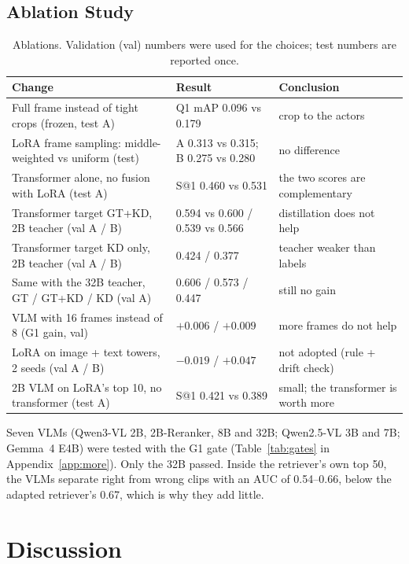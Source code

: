 \documentclass[11pt,a4paper]{article}
\begin{document}
\subsection{Ablation Study}
\begin{table}[H]
\centering
\caption[Ablation study.]{Ablations. Validation (val) numbers were used for the choices; test numbers are reported once.}\label{tab:abl}
\small
\begin{tabular}{p{6.6cm}p{3.9cm}p{4.2cm}}
\toprule
\textbf{Change} & \textbf{Result} & \textbf{Conclusion} \\
\midrule
Full frame instead of tight crops (frozen, test A) & Q1 mAP 0.096 vs 0.179 & crop to the actors \\
LoRA frame sampling: middle-weighted vs uniform (test) & A 0.313 vs 0.315; B 0.275 vs 0.280 & no difference \\
Transformer alone, no fusion with LoRA (test A) & S@1 0.460 vs 0.531 & the two scores are complementary \\
Transformer target GT+KD, 2B teacher (val A / B) & 0.594 vs 0.600 / 0.539 vs 0.566 & distillation does not help \\
Transformer target KD only, 2B teacher (val A / B) & 0.424 / 0.377 & teacher weaker than labels \\
Same with the 32B teacher, GT / GT+KD / KD (val A) & 0.606 / 0.573 / 0.447 & still no gain \\
VLM with 16 frames instead of 8 (G1 gain, val) & $+0.006$ / $+0.009$ & more frames do not help \\
LoRA on image + text towers, 2 seeds (val A / B) & $-0.019$ / $+0.047$ & not adopted (rule + drift check) \\
2B VLM on LoRA's top 10, no transformer (test A) & S@1 0.421 vs 0.389 & small; the transformer is worth more \\
\bottomrule
\end{tabular}
\end{table}

Seven VLMs (Qwen3-VL 2B, 2B-Reranker, 8B and 32B; Qwen2.5-VL 3B and 7B; Gemma~4 E4B) were tested with the G1
gate (Table~\ref{tab:gates} in Appendix~\ref{app:more}). Only the 32B passed. Inside the retriever's own top 50, the
VLMs separate right from wrong clips with an AUC of 0.54--0.66, below the adapted retriever's 0.67, which is why
they add little.

\section{Discussion}\label{sec:disc}
\end{document}
